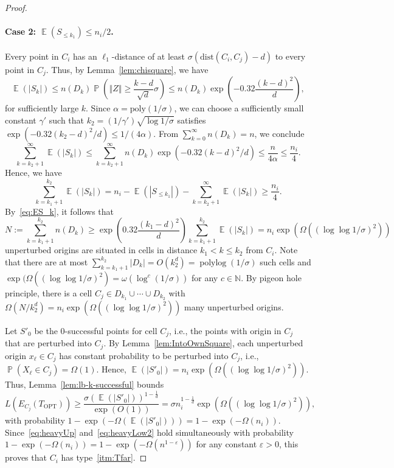 \documentclass[11pt,DIV=12,a4paper]{scrartcl}
\DeclareMathOperator{\probab}{\mathbb{P}}
\DeclareMathOperator{\expected}{\mathbb{E}}
\DeclareMathOperator{\polylog}{polylog}
\newcommand{\distance}{\mathrm{dist}}
\newcommand{\itemref}[1]{\ref{itm:#1}}
\newcommand{\norm}[1]{\left\Vert #1 \right\Vert}
\newcommand{\OPT}{\mathrm{OPT}}
\begin{document}
\begin{proof}
\paragraph{Case 2: $\expected(S_{\le k_1}) \leq n_i/2$.} 
Every point in $C_i$ has an $\ell_1$-distance of at least $\sigma(\distance(C_i,C_j)-d)$ to every point in $C_j$. Thus, by Lemma~\ref{lem:chisquare}, we have
\begin{equation} \label{eq:ES_k}
 \expected(|S_k|) \le n(D_k) \probab\left(\norm{Z} \ge \frac{k-d}{\sqrt{d}}\sigma\right) \le n(D_k)\exp\left(-0.32\frac{(k-d)^2}{d}\right),
\end{equation}
for sufficiently large $k$.
Since $\alpha  = \mathrm{poly}(1/\sigma)$, we can choose a sufficiently small constant $\gamma'$ such that $k_2 = (1/\gamma') \sqrt{ \log 1/\sigma}$ satisfies $\exp(-0.32(k_2-d)^2/d) \le 1/(4\alpha)$. From $\sum_{k=0}^{\infty} n(D_k) = n$, we conclude
\[ \sum_{k=k_2+1}^\infty \expected(|S_k|) \le \sum_{k=k_2+1}^\infty n(D_k) \exp(-0.32(k-d)^2/d) \le \frac{n}{4\alpha} \le \frac{n_i}{4}.\]
Hence, we have
\[\sum_{k=k_1+1}^{k_2} \expected(|S_k|) = n_i - \expected(|S_{\le k_1}|)  - \sum_{k=k_2+1}^\infty \expected(|S_k|) \ge \frac{n_i}{4}.\]
By~\eqref{eq:ES_k}, it follows that
\[ N:= \sum_{k=k_1+1}^{k_2} n(D_k) \ge  \exp\left(0.32\frac{(k_1-d)^2}{d}\right) \sum_{k=k_1+1}^{k_2} \expected(|S_k|) = n_i \exp(\Omega((\log \log 1/\sigma)^2)) \]
unperturbed origins are situated in cells in distance $k_1 < k \le k_2$ from $C_i$. Note that there are at most $\sum_{k=k_1+1}^{k_2} |D_k| = O(k_2^d)=\polylog(1/\sigma)$ such cells and $\exp(\Omega((\log \log 1/\sigma)^2)=\omega(\log^c(1/\sigma))$ for any $c\in \mathbb{N}$. By pigeon hole principle, there is a cell $C_j\in D_{k_1}\cup \cdots \cup D_{k_2}$ with $\Omega(N/k_2^d) = n_i \exp(\Omega((\log \log 1/\sigma)^2))$ many unperturbed origins. 

Let $S'_0$ be the 0-successful points for cell $C_j$, i.e., the points with origin in $C_j$ that are perturbed into $C_j$. By Lemma~\ref{lem:IntoOwnSquare}, each unperturbed origin $x_\ell \in C_j$ has constant probability to be perturbed into $C_j$, i.e., $\probab(X_\ell \in C_j)=\Omega(1)$. Hence, $\expected(|S'_0|) = n_i \exp(\Omega((\log \log 1/\sigma)^2))$. Thus, Lemma~\ref{lem:lb-k-successful} bounds
\begin{equation} \label{eq:heavyLow2}
 L(E_{C_j}(T_\OPT)) \ge \frac{\sigma (\expected(|S'_0|))^{1-\frac{1}{d}}}{\exp(O(1))} = \sigma n_i^{1-\frac{1}{d}} \exp(\Omega((\log \log 1/\sigma)^2)),
\end{equation}
with probability $1-\exp(-\Omega(\expected(|S'_0|))) = 1-\exp(-\Omega(n_i))$. Since~\eqref{eq:heavyUp} and~\eqref{eq:heavyLow2} hold simultaneously with probability $1-\exp(-\Omega(n_i))=1-\exp(-\Omega(n^{1-\varepsilon}))$ for any constant $\varepsilon > 0$, this proves that $C_i$ has type~\itemref{Tfar}.


\end{proof}
\end{document}

